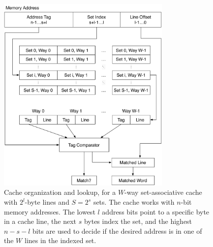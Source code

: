 \begin{figure}[hbt]
  \centering
  \includegraphics[width=85mm]{figures/cpu_cache.pdf}
  \caption{
    Cache organization and lookup, for a $W$-way set-associative cache with
    $2^{l}$-byte lines and $S = 2^{s}$ sets. The cache works with $n$-bit
    memory addresses. The lowest $l$ address bits point to a specific byte in a
    cache line, the next $s$ bytes index the set, and the highest $n - s - l$
    bits are used to decide if the desired address is in one of the $W$ lines
    in the indexed set.
  }
  \label{fig:cpu_cache}
\end{figure}
